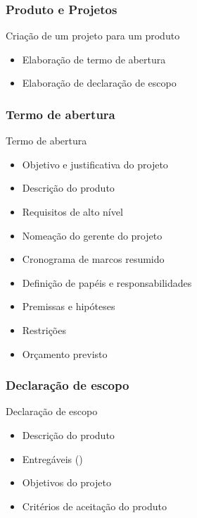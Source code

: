 \begin{frame}[parent={ie:agenda}, hasnext=true, hasprev=false]
	\frametitle{Produto e Projetos}

	\begin{block:fact}{Criação de um projeto para um produto}
		\begin{itemize}
			\item Elaboração de termo de abertura
			\item Elaboração de declaração de escopo
		\end{itemize}
	\end{block:fact}
\end{frame}


\begin{frame}[hasnext=true,hasprev=true]
	\frametitle{Termo de abertura}
	
	\begin{block:concept}{Termo de abertura}
		\begin{itemize}
			\item Objetivo e justificativa do projeto
			\item Descrição do produto
			\item Requisitos de alto nível
			\item Nomeação do gerente do projeto
			\item Cronograma de marcos resumido
			\item Definição de papéis e responsabilidades
			\item Premissas e hipóteses
			\item Restrições
			\item Orçamento previsto
		\end{itemize}
	\end{block:concept}
	
\end{frame}


\begin{frame}
	\frametitle{Declaração de escopo}
	
	\begin{block:concept}{Declaração de escopo}
		\begin{itemize}
			\item Descrição do produto
			\item Entregáveis ()
			\item Objetivos do projeto
			\item Critérios de aceitação do produto
		\end{itemize}
	\end{block:concept}
	
\end{frame}


